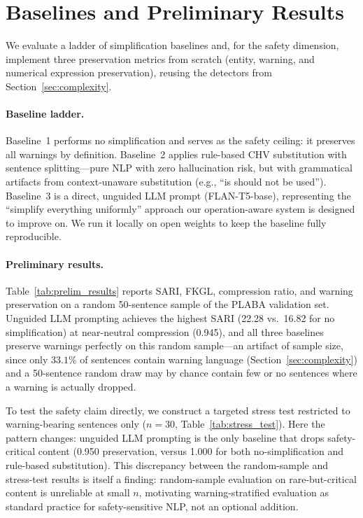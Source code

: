 \documentclass[11pt]{article}
\begin{document}
\section{Baselines and Preliminary Results}
\label{sec:metrics}

We evaluate a ladder of simplification baselines and, for the safety
dimension, implement three preservation metrics from scratch (entity,
warning, and numerical expression preservation), reusing the detectors
from Section~\ref{sec:complexity}.

\paragraph{Baseline ladder.} Baseline~1 performs no simplification and
serves as the safety ceiling: it preserves all warnings by definition.
Baseline~2 applies rule-based CHV substitution with sentence
splitting---pure NLP with zero hallucination risk, but with grammatical
artifacts from context-unaware substitution (e.g., ``is should not be
used''). Baseline~3 is a direct, unguided LLM prompt (FLAN-T5-base),
representing the ``simplify everything uniformly'' approach our
operation-aware system is designed to improve on. We run it locally on
open weights to keep the baseline fully reproducible.

\paragraph{Preliminary results.} Table~\ref{tab:prelim_results} reports
SARI, FKGL, compression ratio, and warning preservation on a random
50-sentence sample of the PLABA validation set. Unguided LLM prompting
achieves the highest SARI (22.28 vs.\ 16.82 for no simplification) at
near-neutral compression (0.945), and all three baselines preserve
warnings perfectly on this random sample---an artifact of sample size,
since only $33.1\%$ of sentences contain warning language
(Section~\ref{sec:complexity}) and a 50-sentence random draw may by
chance contain few or no sentences where a warning is actually dropped.

To test the safety claim directly, we construct a targeted stress test
restricted to warning-bearing sentences only ($n=30$,
Table~\ref{tab:stress_test}). Here the pattern changes: unguided LLM
prompting is the only baseline that drops safety-critical content
(0.950 preservation, versus 1.000 for both no-simplification and
rule-based substitution). This discrepancy between the random-sample and
stress-test results is itself a finding: random-sample evaluation on
rare-but-critical content is unreliable at small $n$, motivating
warning-stratified evaluation as standard practice for safety-sensitive
NLP, not an optional addition.
\end{document}
